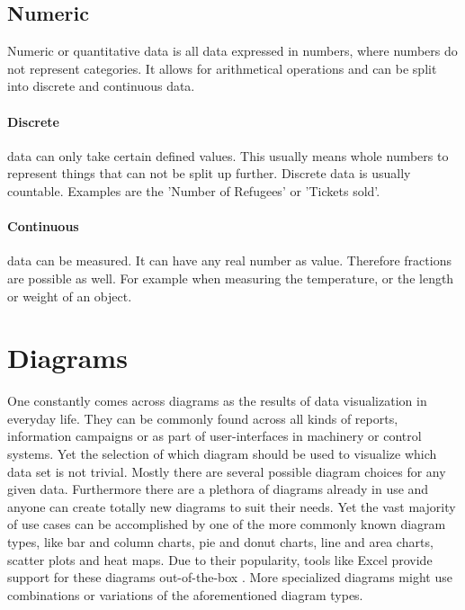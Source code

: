 \subsection{Numeric}

Numeric or quantitative data is all data expressed in numbers, where numbers do not represent categories. It allows for arithmetical operations and can be split into discrete and continuous data.

\paragraph{Discrete}
data can only take certain defined values. This usually means whole numbers to represent things that can not be split up further.  Discrete data is usually countable. Examples are the 'Number of Refugees' or 'Tickets sold'.

\paragraph{Continuous}
data can be measured. It can have any real number as value. Therefore fractions are possible as well. For example when measuring the temperature, or the length or weight of an object.


\section{Diagrams}

One constantly comes across diagrams as the results of data visualization in everyday life. They can be commonly found across all kinds of reports, information campaigns or as part of user-interfaces in machinery or control systems. Yet the selection of which diagram should be used to visualize which data set is not trivial. Mostly there are several possible diagram choices for any given data. Furthermore there are a plethora of diagrams already in use and anyone can create totally new diagrams to suit their needs. Yet the vast majority of use cases can be accomplished by one of the more commonly known diagram types, like bar and column charts, pie and donut charts, line and area charts, scatter plots and heat maps. Due to their popularity, tools like Excel provide support for these diagrams out-of-the-box \cite{office_chart_types}. More specialized diagrams might use combinations or variations of the aforementioned diagram types. 

